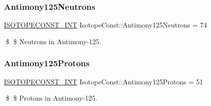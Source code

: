 \subsubsection{\texorpdfstring{Antimony125\+Neutrons}{Antimony125Neutrons}}
{\footnotesize\ttfamily \mbox{\hyperlink{group___isotope_const-_macros_ga5f18360b3e99483a35c32d789e62621c}{I\+S\+O\+T\+O\+P\+E\+C\+O\+N\+S\+T\+\_\+\+I\+NT}} Isotope\+Const\+::\+Antimony125\+Neutrons = 74}

\$ \$ Neutrons in Antimony-\/125. \mbox{\label{group___isotope_const-_antimony-_sb125_ga0cdb5958a5c8c33856103b759cc3055d}} 
\subsubsection{\texorpdfstring{Antimony125\+Protons}{Antimony125Protons}}
{\footnotesize\ttfamily \mbox{\hyperlink{group___isotope_const-_macros_ga5f18360b3e99483a35c32d789e62621c}{I\+S\+O\+T\+O\+P\+E\+C\+O\+N\+S\+T\+\_\+\+I\+NT}} Isotope\+Const\+::\+Antimony125\+Protons = 51}

\$ \$ Protons in Antimony-\/125. 
